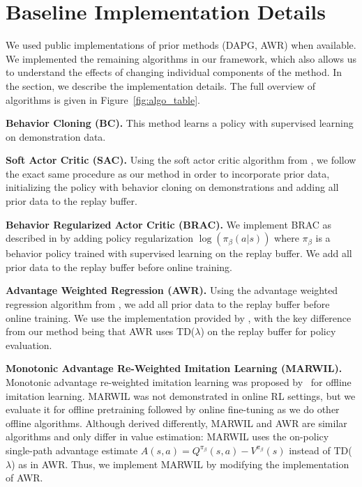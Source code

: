 \section{Baseline Implementation Details} \label{sec:baseline_impl}

We used public implementations of prior methods (DAPG, AWR) when available. We implemented the remaining algorithms in our framework, which also allows us to understand the effects of changing individual components of the method. In the section, we describe the implementation details. The full overview of algorithms is given in Figure~\ref{fig:algo_table}.

\textbf{Behavior Cloning (BC).}  This method learns a policy with supervised learning on demonstration data.

\textbf{Soft Actor Critic (SAC).} Using the soft actor critic algorithm from \citep{haarnoja2018sac}, we follow the exact same procedure as our method in order to incorporate prior data, initializing the policy with behavior cloning on demonstrations and adding all prior data to the replay buffer. 

\textbf{Behavior Regularized Actor Critic (BRAC).} We implement BRAC as described in \citep{wu2019brac} by adding policy regularization $\log(\pi_\beta(a|s))$ where $\pi_\beta$ is a behavior policy trained with supervised learning on the replay buffer. We add all prior data to the replay buffer before online training. 

\textbf{Advantage Weighted Regression (AWR).} Using the advantage weighted regression algorithm from \citep{peng2019awr}, we add all prior data to the replay buffer before online training. We use the implementation provided by \citet{peng2019awr}, with the key difference from our method being that AWR uses TD($\lambda$) on the replay buffer for policy evaluation.

\textbf{Monotonic Advantage Re-Weighted Imitation Learning (MARWIL).} Monotonic advantage re-weighted imitation learning was proposed by~\citet{wang2018marwil} for offline imitation learning. MARWIL was not demonstrated in online RL settings, but we evaluate it for offline pretraining followed by online fine-tuning as we do other offline algorithms. Although derived differently, MARWIL and AWR are similar algorithms and only differ in value estimation: MARWIL uses the on-policy single-path advantage estimate $A(s, a) = Q^{\pi_\beta}(s, a) - V^{\pi_\beta}(s)$ instead of TD($\lambda$) as in AWR. Thus, we implement MARWIL by modifying the implementation of AWR.

